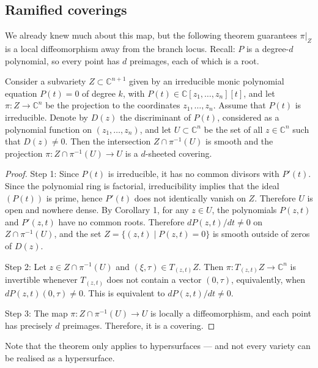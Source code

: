 \subsection{Ramified coverings}
\label{subsection-ramified-coverings}

\medskip\noindent
We already knew much about this map,
but the following theorem guarantees
$\pi|_Z$ is a local diffeomorphism
away from the branch locus.
Recall: $P$ is a degree-$d$ polynomial,
so every point has $d$ preimages,
each of which is a root.

\begin{theorem}
\label{theorem-discriminant-ramified-covering}
Consider a subvariety $Z \subset
\mathbb{C}^{n+1}$ given by an irreducible
monic polynomial equation $P(t)=0$ of
degree $k$, with
$P(t)\in \mathbb{C}[z_1,\dots,z_n][t]$,
and let $\pi:Z \to \mathbb{C}^n$ be the
projection to the coordinates
$z_1,\dots,z_n$. Assume that $P(t)$ is
irreducible. Denote by $D(z)$ the
discriminant of $P(t)$, considered as a
polynomial function on $(z_1,\dots,z_n)$,
and let $U \subset \mathbb{C}^n$ be the set
of all $z \in \mathbb{C}^n$ such that
$D(z)\neq 0$. Then the intersection
$Z \cap \pi^{-1}(U)$ is smooth and the
projection
$\pi:Z\cap \pi^{-1}(U)\to U$ is a $d$-sheeted
covering.
\end{theorem}

\begin{proof}
Step 1: Since $P(t)$ is irreducible, it has
no common divisors with $P'(t)$. Since the
polynomial ring is factorial,
irreducibility implies that the ideal
$(P(t))$ is prime, hence $P'(t)$ does not
identically vanish on $Z$. Therefore $U$ is
open and nowhere dense. By Corollary 1, for
any $z \in U$, the polynomials $P(z,t)$ and
$P'(z,t)$ have no common roots. Therefore
$dP(z,t)/dt\neq 0$ on
$Z \cap \pi^{-1}(U)$, and the set
$Z=\{(z,t)\mid P(z,t)=0\}$ is smooth outside
of zeros of $D(z)$.

Step 2: Let $z \in Z\cap \pi^{-1}(U)$ and
$(\xi,\tau)\in T_{(z,t)}Z$. Then
$\pi:T_{(z,t)}Z\to \mathbb{C}^n$ is
invertible whenever $T_{(z,t)}$ does not
contain a vector $(0,\tau)$, equivalently,
when $dP(z,t)(0,\tau)\neq 0$. This is
equivalent to
$dP(z,t)/dt\neq 0$.

Step 3: The map
$\pi:Z\cap\pi^{-1}(U)\to U$ is locally a
diffeomorphism, and each point has precisely
$d$ preimages. Therefore, it is a covering.
\end{proof}

\noindent
Note that the theorem only applies
to hypersurfaces --- and not every
variety can be realised as a hypersurface.

